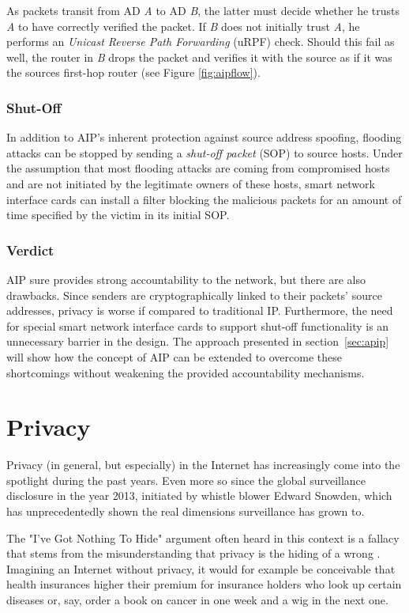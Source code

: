 \documentclass{acm_proc_article-sp}
\begin{document}
As packets transit from AD \emph{A} to AD \emph{B}, the latter must decide whether he trusts \emph{A} to have correctly verified the packet. If \emph{B} does not initially trust \emph{A}, he performs an \emph{Unicast Reverse Path Forwarding} (uRPF) check. Should this fail as well, the router in \emph{B} drops the packet and verifies it with the source as if it was the sources first-hop router (see Figure \ref{fig:aipflow}).

\subsubsection{Shut-Off}
In addition to AIP's inherent protection against source address spoofing, flooding attacks can be stopped by sending a \emph{shut-off packet} (SOP) to source hosts. Under the assumption that most flooding attacks are coming from compromised hosts and are not initiated by the legitimate owners of these hosts, smart network interface cards can install a filter blocking the malicious packets for an amount of time specified by the victim in its initial SOP.

\subsubsection{Verdict}
AIP sure provides strong accountability to the network, but there are also drawbacks. Since senders are cryptographically linked to their packets' source addresses, privacy is worse if compared to traditional IP. Furthermore, the need for special smart network interface cards to support shut-off functionality is an unnecessary barrier in the design. The approach presented in section~\ref{sec:apip} will show how the concept of AIP can be extended to overcome these shortcomings without weakening the provided accountability mechanisms.


\section{Privacy}
\label{sec:priv}
Privacy (in general, but especially) in the Internet has increasingly come into the spotlight during the past years. Even more so since the global surveillance disclosure in the year 2013, initiated by whistle blower Edward Snowden, which has unprecedentedly shown the real dimensions surveillance has grown to.

The "I've Got Nothing To Hide" argument often heard in this context is a fallacy that stems from the misunderstanding that privacy is the hiding of a wrong \cite{solove}. Imagining an Internet without privacy, it would for example be conceivable that health insurances higher their premium for insurance holders who look up certain diseases or, say, order a book on cancer in one week and a wig in the next one.
\end{document}
